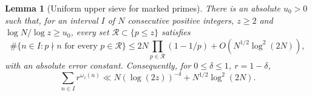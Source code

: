 \documentclass[11pt]{article}
\newtheorem{lemma}[theorem]{Lemma}
\theoremstyle{definition}
\theoremstyle{remark}
\numberwithin{equation}{section}
\begin{document}
\begin{lemma}[Uniform upper sieve for marked primes]\label{lem:marked-window}
There is an absolute $u_0>0$ such that, for an interval $I$ of $N$ consecutive positive integers, $z\ge2$ and
$\log N/\log z\ge u_0$, every set $\mathcal R\subset\{p\le z\}$ satisfies
\begin{equation}\label{eq:marked-window-sieve}
 \#\{n\in I:p\nmid n\text{ for every }p\in\mathcal R\}
 \le2N\prod_{p\in\mathcal R}(1-1/p)+O(N^{1/2}\log^2(2N)),
\end{equation}
with an absolute error constant. Consequently, for $0\le\delta\le1$, $r=1-\delta$,
\begin{equation}\label{eq:marked-window-average}
 \sum_{n\in I}r^{\omega_z(n)}
 \ll N(\log(2z))^{-\delta}+N^{1/2}\log^2(2N).
\end{equation}
\end{lemma}
\end{document}
